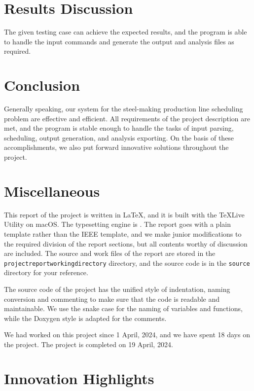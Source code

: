 \documentclass[a4paper, 12pt]{article}
\begin{document}
\section{Results Discussion}

The given testing case can achieve the expected results, 
and the program is able to handle the input commands and generate the output and analysis files as required.

\section{Conclusion}

Generally speaking, our system for the steel-making production line scheduling problem are effective and efficient.
All requirements of the project description are met, and the program is stable enough to handle the tasks of input parsing, scheduling, output generation, and analysis exporting.
On the basis of these accomplishments, we also put forward innovative solutions throughout the project. 

\section{Miscellaneous}

This report of the project is written in \LaTeX, and it is built with the \TeX  Live Utility on macOS. The typesetting engine is \XeLaTeX. 
The report goes with a plain template rather than the IEEE template, and we make junior modifications to the required division of the report sections, but
all contents worthy of discussion are included. The source and work files of the report are stored in the \texttt{project\textunderscore report\textunderscore working\textunderscore directory} directory, and the source code is in the \texttt{source} directory for your reference.

The source code of the project has the unified style of indentation, naming conversion and commenting to make sure that the code is readable and maintainable.
We use the snake case for the naming of variables and functions, while the Doxygen style is adapted for the comments. 

We had worked on this project since 1 April, 2024, and we have spent 18 days on the project. The project is completed on 19 April, 2024.

\section{Innovation Highlights}
\end{document}
